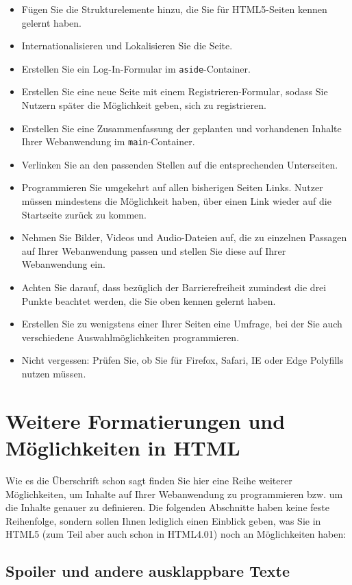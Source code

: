 \begin{itemize}
	\item Fügen Sie die Strukturelemente hinzu, die Sie für HTML5-Seiten kennen gelernt haben.
	\item Internationalisieren und Lokalisieren Sie die Seite.
	\item Erstellen Sie ein Log-In-Formular im \verb|aside|-Container.
	\item Erstellen Sie eine neue Seite mit einem Registrieren-Formular, sodass Sie Nutzern später die Möglichkeit geben, sich zu registrieren. 
	\item Erstellen Sie eine Zusammenfassung der geplanten und vorhandenen Inhalte Ihrer Webanwendung im \verb|main|-Container.
	\item Verlinken Sie an den passenden Stellen auf die entsprechenden Unterseiten.
	\item Programmieren Sie umgekehrt auf allen bisherigen Seiten Links. Nutzer müssen mindestens die Möglichkeit haben, über einen Link wieder auf die Startseite zurück zu kommen.
	\item Nehmen Sie Bilder, Videos und Audio-Dateien auf, die zu einzelnen Passagen auf Ihrer Webanwendung passen und stellen Sie diese auf Ihrer Webanwendung ein.
	\item Achten Sie darauf, dass bezüglich der Barrierefreiheit zumindest die drei Punkte beachtet werden, die Sie oben kennen gelernt haben.
	\item Erstellen Sie zu wenigstens einer Ihrer Seiten eine Umfrage, bei der Sie auch verschiedene Auswahlmöglichkeiten programmieren.
	\item Nicht vergessen: Prüfen Sie, ob Sie für Firefox, Safari, IE oder Edge Polyfills nutzen müssen.
\end{itemize}

\section{Weitere Formatierungen und Möglichkeiten in HTML}

Wie es die Überschrift schon sagt finden Sie hier eine Reihe weiterer Möglichkeiten, um Inhalte auf Ihrer Webanwendung zu programmieren bzw. um die Inhalte genauer zu definieren. Die folgenden Abschnitte haben keine feste Reihenfolge, sondern sollen Ihnen lediglich einen Einblick geben, was Sie in HTML5 (zum Teil aber auch schon in HTML4.01) noch an Möglichkeiten haben:

\subsection{Spoiler und andere ausklappbare Texte}

